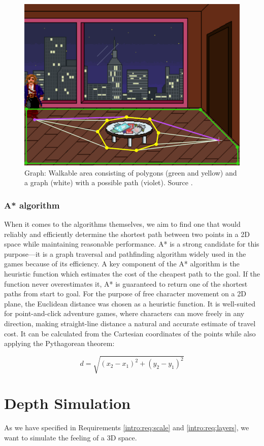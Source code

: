 \begin{figure}[H]
\centering
\includegraphics[width=.8\linewidth]{img/WS-polygons3.png}
\caption{Graph: Walkable area consisting of polygons (green and yellow) and a graph (white) with a possible path (violet). Source \cite{Uurloon1}.}
\label{fig:Graph}
\end{figure}

\subsubsection{A* algorithm}
When it comes to the algorithms themselves, we aim to find one that would reliably and efficiently determine the shortest path between two points in a 2D space while maintaining reasonable performance. A* is a strong candidate for this purpose—it is a graph traversal and pathfinding algorithm widely used in the games because of its efficiency. A key component of the A* algorithm is the heuristic function which estimates the cost of the cheapest path to the goal. If the function never overestimates it, A* is guaranteed to return one of the shortest paths from start to goal. For the purpose of free character movement on a 2D plane, the Euclidean distance was chosen as a heuristic function. It is well-suited for point-and-click adventure games, where characters can move freely in any direction, making straight-line distance a natural and accurate estimate of travel cost.  It can be calculated from the Cartesian coordinates of the points while also applying the Pythagorean theorem:

\[
d = \sqrt{(x_2 - x_1)^2 + (y_2 - y_1)^2}
\]

\section{Depth Simulation}
As we have specified in Requirements \ref{intro:req:scale} and \ref{intro:req:layers}, we want to simulate the feeling of a 3D space.

